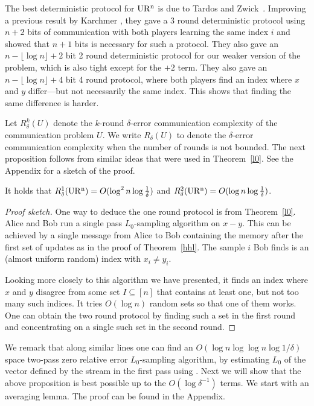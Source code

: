 The best deterministic protocol for $\operatorname{UR^n}$ is due to Tardos and
Zwick~\cite{TardosZ1997}. Improving a previous result by
Karchmer \cite{Karchmer1989}, they gave a 3 round deterministic
protocol using $n+2$ bits of communication with both players
learning the same index $i$ and showed that $n+1$ bits is
necessary for such a protocol. They also gave an $n-\lfloor\log
n\rfloor+2$ bit 2 round deterministic protocol for our weaker
version of the problem, which is also tight except for the $+2$
term. They also gave an $n-\lfloor\log n\rfloor+4$ bit 4 round
protocol, where both players find an index where $x$ and $y$
differ---but not necessarily the same index. This shows that
finding the same difference is harder.

Let $R^k_\delta(U)$ denote the $k$-round $\delta$-error communication
complexity of the communication problem $U$. We write $R_\delta(U)$ to denote
the $\delta$-error communication complexity when the number of rounds is not
bounded. The next proposition follows from similar ideas that were used in 
Theorem~\ref{l0}. See the Appendix for a sketch of the proof.

\begin{proposition}\label{thm:urub}
It holds that $R^1_\delta(\operatorname{UR^n})=O(\log^2 n\log\frac{1}{\delta})$ and $R^2_\delta(\operatorname{UR^n})=O(\log n\log\frac{1}{\delta})$.
\end{proposition}

\begin{proof}[Proof sketch] One way to deduce the one round protocol is from
  Theorem~\ref{l0}. Alice and Bob run a single pass $L_0$-sampling algorithm
  on $x-y$. This can be achieved by a single message from Alice to Bob
  containing the memory after the first set of updates as in the proof of
  Theorem~\ref{hhl}. The sample $i$ Bob finds is an (almost uniform random)
  index with $x_i\ne y_i$.

Looking more closely to this algorithm we have presented, it finds an index
where $x$ and $y$ disagree from some set $I\subseteq[n]$ that contains at
least one, but not too many such indices. It tries $O(\log n)$ random sets so
that one of them works. One can obtain the two round
protocol by finding such a set in the first round and concentrating on a
single such set in the second round.
\end{proof}

We remark that along similar lines one can find an $O(\log n \log\log n\log1/\delta )$
space two-pass zero relative error $L_0$-sampling algorithm, by estimating  $L_0$ 
of the vector defined by the stream in the first pass using \cite{KaneNW2010}. Next
 we will show that the above proposition is best possible up to the $O(\log\delta^{-1})$
terms. We start with an averaging lemma. The proof can be found in the Appendix.


